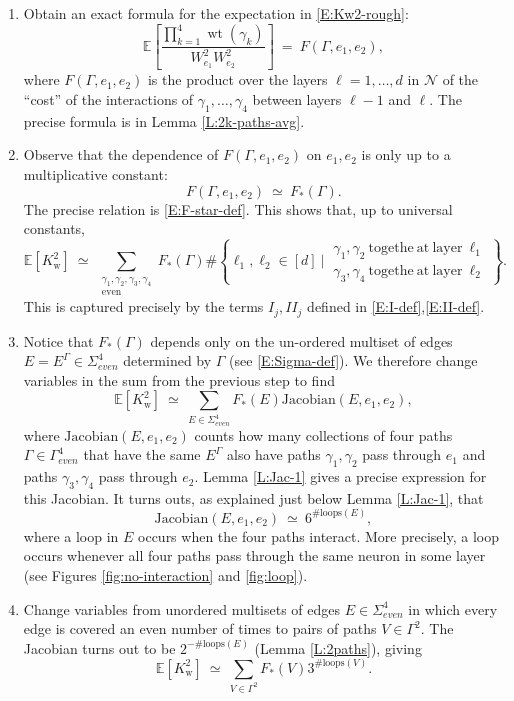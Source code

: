 \documentclass[11pt, reqno]{amsart}
\newcommand{\E}[1]{{\mathbb E}\left [#1\right]}
\newcommand{\e}{\mathbb E}
\newcommand{\mN}{\mathcal N}
\newcommand{\Kw}{K_{\mathrm{w}}}
\DeclareMathOperator{\wt}{wt}
\begin{document}
\begin{enumerate}
    \item Obtain an exact formula for the expectation in \eqref{E:Kw2-rough}:
    \[\E{\frac{\prod_{k=1}^4 \wt(\gamma_k)}{W_{e_1}^2W_{e_2}^2}}~=~F(\Gamma, e_1,e_2),\]
    where $F(\Gamma,e_1,e_2)$ is the product over the layers $\ell=1,\ldots, d$ in $\mN$ of the ``cost'' of the interactions of $\gamma_1,\ldots,\gamma_4$ between layers $\ell-1$ and $\ell.$ The precise formula is in Lemma \ref{L:2k-paths-avg}.
    \item Observe that the dependence of $F(\Gamma, e_1,e_2)$ on $e_1,e_2$ is only up to a multiplicative constant: 
    \[F(\Gamma,e_1,e_2)~\simeq~ F_*(\Gamma).\]
    The precise relation is \eqref{E:F-star-def}. This shows that, up to universal constants, 
    \[\e[\Kw^2]~\simeq ~ \sum_{\substack{ \gamma_1,\gamma_2,\gamma_3,\gamma_4\\\mathrm{even}}}F_*(\Gamma) \#\left\{\ell_1,\ell_2\in [d]~\big|~\substack{\gamma_1,\gamma_2\mathrm{~togethe~at~layer~}\ell_1\\\gamma_3,\gamma_4\mathrm{~togethe~at~layer~}\ell_2} \right\}.\]
    This is captured precisely by the terms $I_j,II_j$ defined in \eqref{E:I-def},\eqref{E:II-def}.
    \item Notice that $F_*(\Gamma)$ depends only on the un-ordered multiset of edges $E=E^\Gamma\in \Sigma_{even}^4$ determined by $\Gamma$ (see \eqref{E:Sigma-def}). We therefore change variables in the sum from the previous step to find
    \[\e[\Kw^2]~\simeq ~ \sum_{E\in \Sigma_{even}^4}F_*(E) \mathrm{Jacobian}(E, e_1,e_2),\]
    where $\mathrm{Jacobian}(E, e_1,e_2)$ counts how many collections of four paths $\Gamma \in \Gamma_{even}^4$ that have the same $E^\Gamma$ also have paths $\gamma_1,\gamma_2$ pass through $e_1$ and paths $\gamma_3,\gamma_4$ pass through $e_2.$ Lemma \ref{L:Jac-1} gives a precise expression for this Jacobian. It turns outs, as explained just below Lemma \ref{L:Jac-1}, that
    \[\mathrm{Jacobian}(E, e_1,e_2)~\simeq~6^{\#\mathrm{loops}(E)},\]
    where a loop in $E$ occurs when the four paths interact. More precisely, a loop occurs whenever all four paths pass through the same neuron in some layer (see Figures \ref{fig:no-interaction} and \ref{fig:loop}). 
    \item Change variables from unordered multisets of edges $E\in \Sigma_{even}^4$ in which every edge is covered an even number of times to pairs of paths $V\in \Gamma^2$. The Jacobian turns out to be $2^{-\#\mathrm{loops}(E)}$ (Lemma \ref{L:2paths}), giving
    \[\e[\Kw^2]~\simeq ~ \sum_{V\in \Gamma^2} F_*(V)3^{\#\mathrm{loops}(V)}.\]

\end{enumerate}
\end{document}
